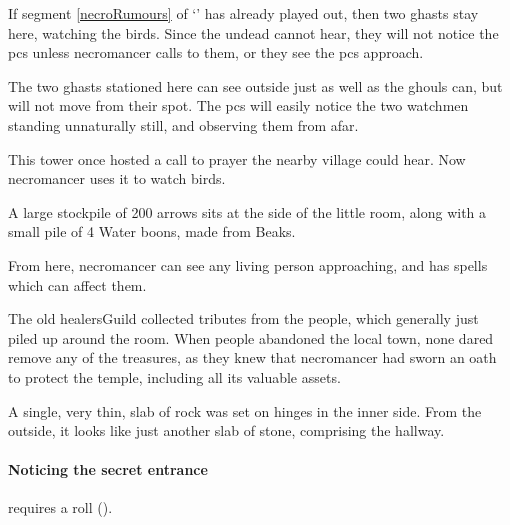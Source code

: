 \begin{multicols}{2}


If \gls{segment} \ref{necroRumours} of `' has already played out, then two ghasts stay here, watching the birds.
Since the undead cannot hear, they will not notice the \glspl{pc} unless \gls{necromancer} calls to them, or they see the \glspl{pc} approach.


The two ghasts stationed here can see outside just as well as the ghouls can, but will not move from their spot.
The \glspl{pc} will easily notice the two watchmen standing unnaturally still, and observing them from afar.


\begin{exampletext}
This tower once hosted a call to prayer the nearby \gls{village} could hear.
Now \gls{necromancer} uses it to watch birds.
\end{exampletext}

A large stockpile of 200 arrows sits at the side of the little room, along with a small pile of 4 Water \glspl{boon}, made from  Beaks.

From here, \gls{necromancer} can see any living person approaching, and has spells which can affect them.

\thenecromancer

\showStdSpells


\begin{exampletext}
  The old \gls{healersGuild} collected tributes from the people, which generally just piled up around the room.
  When people abandoned the local town, none dared remove any of the treasures, as they knew that \gls{necromancer} had sworn an oath to protect the temple, including all its valuable assets.
\end{exampletext}

\noindent
A single, very thin, slab of rock was set on hinges in the inner side.
From the outside, it looks like just another slab of stone, comprising the hallway.

\paragraph{Noticing the secret entrance}
requires a  roll (\tn[12]).


\end{multicols}
